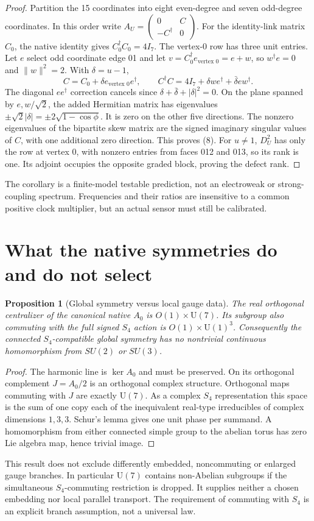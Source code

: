 \documentclass[11pt,a4paper]{article}
\newtheorem{proposition}[theorem]{Proposition}
\newcommand{\U}{\mathrm U}
\newcommand{\ad}{\dagger}
\begin{document}
\begin{proof}
Partition the 15 coordinates into eight even-degree and seven
odd-degree coordinates. In this order write
$A_U=\left(\begin{smallmatrix}0&C\\-C^\ad&0\end{smallmatrix}\right)$.
For the identity-link matrix $C_0$, the native identity gives
$C_0^\ad C_0=4I_7$. The vertex-0 row has three unit entries.
Let $e$ select odd coordinate edge 01 and let
$v=C_0^\ad e_{\text{vertex }0}=e+w$, so $w^\ad e=0$ and
$\|w\|^2=2$. With $\delta=u-1$,
\[
 C=C_0+\delta e_{\text{vertex }0}e^\ad,\qquad
 C^\ad C=4I_7+\delta we^\ad+\bar\delta ew^\ad .
\]
The diagonal $ee^\ad$ correction cancels since
$\delta+\bar\delta+|\delta|^2=0$. On the plane spanned by
$e,w/\sqrt2$, the added Hermitian matrix has eigenvalues
$\pm\sqrt2|\delta|=\pm2\sqrt{1-\cos\phi}$.
It is zero on the other five directions. The nonzero eigenvalues
of the bipartite skew matrix are the signed imaginary singular
values of $C$, with one additional zero direction. This proves (8).
For $u\ne1$, $D_U^2$ has only the row at vertex 0, with nonzero
entries from faces 012 and 013, so its rank is one. Its adjoint
occupies the opposite graded block, proving the defect rank.
\end{proof}

The corollary is a finite-model testable prediction, not an
electroweak or strong-coupling spectrum. Frequencies and their ratios
are insensitive to a common positive clock multiplier, but an
actual sensor must still be calibrated.

\section{What the native symmetries do and do not select}
\begin{proposition}[Global symmetry versus local gauge data]
The real orthogonal centralizer of the canonical native $A_0$ is
$O(1)\times\U(7)$. Its subgroup also commuting with the full signed
$S_4$ action is $O(1)\times\U(1)^3$. Consequently the connected
$S_4$-compatible global symmetry has no nontrivial continuous
homomorphism from $SU(2)$ or $SU(3)$.
\end{proposition}
\begin{proof}
The harmonic line is $\ker A_0$ and must be preserved. On its
orthogonal complement $J=A_0/2$ is an orthogonal complex structure.
Orthogonal maps commuting with $J$ are exactly $\U(7)$.
As a complex $S_4$ representation this space is the sum of one
copy each of the inequivalent real-type irreducibles of complex
dimensions $1,3,3$. Schur's lemma gives one unit phase per summand.
A homomorphism from either connected simple group to the abelian
torus has zero Lie algebra map, hence trivial image.
\end{proof}
This result does not exclude differently embedded, noncommuting
or enlarged gauge branches. In particular $\U(7)$ contains
non-Abelian subgroups if the simultaneous $S_4$-commuting restriction
is dropped. It supplies neither a chosen embedding nor local
parallel transport. The requirement of commuting with $S_4$ is
an explicit branch assumption, not a universal law.
\end{document}
